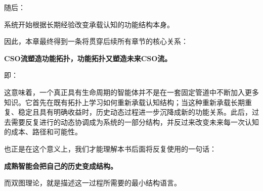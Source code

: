 随后：

\begin{statementbox}
\centering
{}
\end{statementbox}

系统开始根据长期经验改变承载认知的功能结构本身。

因此，本章最终得到一条将贯穿后续所有章节的核心关系：

\begin{conclusion}
\bfseries
CSO流塑造功能拓扑，功能拓扑又塑造未来CSO流。
\end{conclusion}

即：
\begin{statementbox}
\centering
{}
\end{statementbox}

这意味着，一个真正具有生命周期的智能体并不是在一套固定管道中不断加入更多知识。它首先在既有拓扑上学习如何重新承载认知结构；当这种重新承载长期重复、稳定且具有明确收益时，历史动态过程进一步沉降成新的功能关系。此后，过去需要反复进行的动态协调成为系统的一部分结构，并反过来改变未来每一次认知的成本、路径和可能性。

也正是在这个意义上，我们才能理解本书后面将反复使用的一句话：

\begin{conclusion}
\bfseries
成熟智能会把自己的历史变成结构。
\end{conclusion}

而双图理论，就是描述这一过程所需要的最小结构语言。
